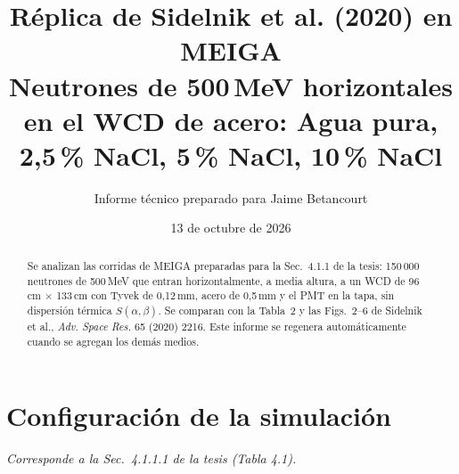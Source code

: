 \documentclass[11pt,a4paper]{article}
\title{Réplica de Sidelnik et al. (2020) en MEIGA \\ \large Neutrones de 500\,MeV horizontales en el WCD de acero: Agua pura, 2,5\,\% NaCl, 5\,\% NaCl, 10\,\% NaCl}
\author{Informe técnico preparado para Jaime Betancourt}
\date{13 de octubre de 2026}
\begin{document}
\maketitle
\begin{abstract}
Se analizan las corridas de MEIGA preparadas para la Sec.~4.1.1 de la tesis: 150\,000 neutrones de 500\,MeV que entran horizontalmente,
a media altura, a un WCD de 96\,cm $\times$ 133\,cm con Tyvek de 0,12\,mm, acero de 0,5\,mm y el PMT en la tapa, sin dispersión térmica $S(\alpha,\beta)$.
Se comparan con la Tabla~2 y las Figs.~2--6 de Sidelnik et al., \textit{Adv. Space Res.} 65 (2020) 2216.
Este informe se regenera automáticamente cuando se agregan los demás medios.
\end{abstract}
\tableofcontents

\section{Configuración de la simulación}
{\small\textit{Corresponde a la Sec.~4.1.1.1 de la tesis (Tabla 4.1).}}
\end{document}
